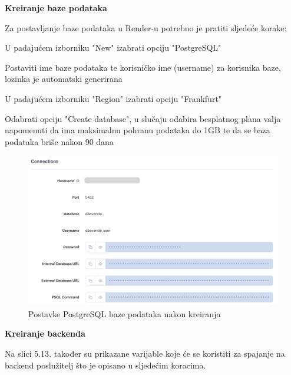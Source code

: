 			\textbf{Kreiranje baze podataka}
			
			Za postavljanje baze podataka u Render-u potrebno je pratiti sljedeće korake:
			
			\begin{packed_enum}
				
				\item  U padajućem izborniku "New" izabrati opciju "PostgreSQL"
				\item	Postaviti ime baze podataka te korisničko ime (username) za korisnika baze, lozinka je automatski generirana
				\item	U padajućem izborniku "Region" izabrati opciju "Frankfurt"
				\item	Odabrati opciju "Create database", u slučaju odabira besplatnog plana valja napomenuti da ima maksimalnu pohranu podataka do 1GB te da se baza podataka briše nakon 90 dana 

			\end{packed_enum}
		
			\begin{figure}[H]
				\includegraphics[scale=0.45]{deploy/baza.png}
				\centering
				\caption{Postavke PostgreSQL baze podataka nakon kreiranja}
				\label{fig:promjene}
			\end{figure}
			
			\textbf{Kreiranje backenda}
			
			Na slici 5.13. također su prikazane varijable koje će se koristiti za spajanje na backend poslužitelj što je opisano u sljedećim koracima.
			
